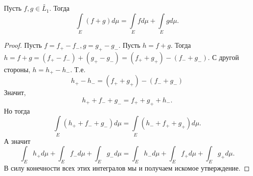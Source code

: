 \begin{proposition}
    Пусть $f, g \in \widetilde{L_1}$. Тогда \[\int\limits_E (f + g)d\mu = \int\limits_E fd\mu + \int\limits_E gd\mu.\]
\end{proposition}
\begin{proof}
    Пусть $f = f_+ - f_-, g = g_+ - g_-$. Пусть $h = f + g$. Тогда $h = f + g = (f_+ - f_-) + (g_+ - g_-) = (f_+ + g_+) - (f_- + g_-)$. С другой стороны, $h = h_+ - h_-$. Т.е. \[h_+ - h_- = (f_+ + g_+) - (f_- + g_-)\]
    Значит, \[h_+ + f_- + g_- = f_+ + g_+ + h_-.\]
    Но тогда \[\int\limits_E (h_+ + f_- + g_-)d\mu = \int\limits_E (h_- + f_+ + g_+)d\mu.\]
    А значит \[\int_E h_+d\mu + \int_E f_-d\mu + \int_E g_-d\mu = \int_E h_-d\mu + \int_E f_+d\mu + \int_E g_+d\mu.\]
    В силу конечности всех этих интегралов мы и получаем искомое утверждение.
\end{proof}
